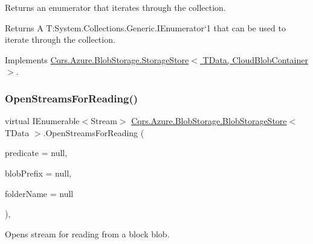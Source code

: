 Returns an enumerator that iterates through the collection. 

\begin{DoxyReturn}{Returns}
A T\+:\+System.\+Collections.\+Generic.\+I\+Enumerator`1 that can be used to iterate through the collection. 
\end{DoxyReturn}


Implements \hyperlink{classCqrs_1_1Azure_1_1BlobStorage_1_1StorageStore_a2eb689ea51d586309b79d6cbac05b616_a2eb689ea51d586309b79d6cbac05b616}{Cqrs.\+Azure.\+Blob\+Storage.\+Storage\+Store$<$ T\+Data, Cloud\+Blob\+Container $>$}.

\mbox{\label{classCqrs_1_1Azure_1_1BlobStorage_1_1BlobStorageStore_a6a916e23890ba65048e449353bbd17c2_a6a916e23890ba65048e449353bbd17c2}} 
\subsubsection{\texorpdfstring{Open\+Streams\+For\+Reading()}{OpenStreamsForReading()}}
{\footnotesize\ttfamily virtual I\+Enumerable$<$Stream$>$ \hyperlink{classCqrs_1_1Azure_1_1BlobStorage_1_1BlobStorageStore}{Cqrs.\+Azure.\+Blob\+Storage.\+Blob\+Storage\+Store}$<$ T\+Data $>$.Open\+Streams\+For\+Reading (\begin{DoxyParamCaption}\item[{Func$<$ Cloud\+Block\+Blob, bool $>$}]{predicate = {\ttfamily null},  }\item[{string}]{blob\+Prefix = {\ttfamily null},  }\item[{string}]{folder\+Name = {\ttfamily null} }\end{DoxyParamCaption})\hspace{0.3cm}{\ttfamily [protected]}, {\ttfamily [virtual]}}



Opens stream for reading from a block blob. 

\mbox{\label{classCqrs_1_1Azure_1_1BlobStorage_1_1BlobStorageStore_a4371b95250e51b8462d8ab33b6f3fe9e_a4371b95250e51b8462d8ab33b6f3fe9e}} 
